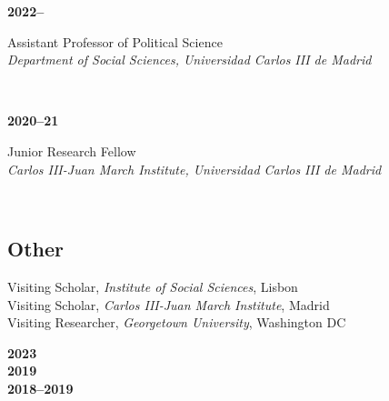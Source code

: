 \documentclass[a4paper, 12pt]{article}
\begin{document}
\begin{minipage}[t]{0.12\textwidth}
\textbf{2022--}
\end{minipage}\hfill\begin{minipage}[t]{0.88\textwidth}
Assistant Professor of Political Science\\
\textit{Department of Social Sciences, Universidad Carlos III de Madrid}\\\vspace{-8pt}
\end{minipage}\\
\begin{minipage}[t]{0.12\textwidth}
\textbf{2020--21}
\end{minipage}\hfill\begin{minipage}[t]{0.88\textwidth}
Junior Research Fellow\\
\textit{Carlos III-Juan March Institute, Universidad Carlos III de Madrid}\\\vspace{-8pt}
\end{minipage}\\

\vspace{-10pt}
\subsection*{Other}

\begin{minipage}[t]{0.82\textwidth}
  Visiting Scholar, \textit{Institute of Social Sciences}, Lisbon\vspace{2pt}\\
  Visiting Scholar, \textit{Carlos III-Juan March Institute}, Madrid\vspace{2pt}\\
	Visiting Researcher, \textit{Georgetown University}, Washington DC
\end{minipage}
\begin{minipage}[t]{0.18\textwidth}
  \flushright
	\textbf{2023}\\\vspace{7pt}
  \textbf{2019}\\\vspace{7pt}
	\textbf{2018--2019}
\end{minipage}
\end{document}
